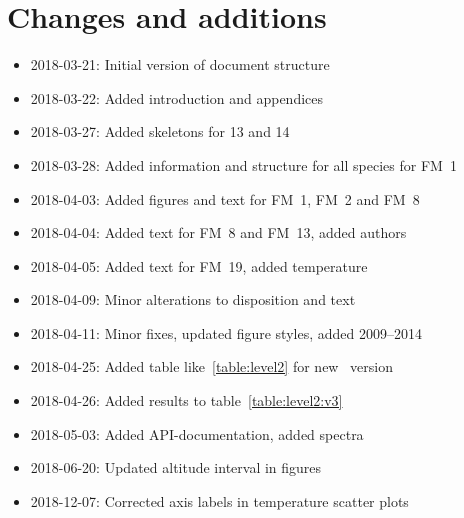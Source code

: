 \chapter{Changes and additions}
\label{ch:changes}

\begin{itemize}
    \item 2018-03-21: Initial version of document structure
    \item 2018-03-22: Added introduction and appendices
    \item 2018-03-27: Added skeletons for 13 and 14
    \item 2018-03-28: Added information and structure for all species for FM~1
    \item 2018-04-03: Added figures and text for FM~1, FM~2 and FM~8
    \item 2018-04-04: Added text for FM~8 and FM~13, added authors
    \item 2018-04-05: Added text for FM~19, added temperature
    \item 2018-04-09: Minor alterations to disposition and text
    \item 2018-04-11: Minor fixes, updated figure styles, added 2009--2014
    \item 2018-04-25: Added table like~\ref{table:level2} for new \smr~version
    \item 2018-04-26: Added results to table~\ref{table:level2:v3}
    \item 2018-05-03: Added API-documentation, added spectra
    \item 2018-06-20: Updated altitude interval in figures
    \item 2018-12-07: Corrected axis labels in temperature scatter plots
\end{itemize}
